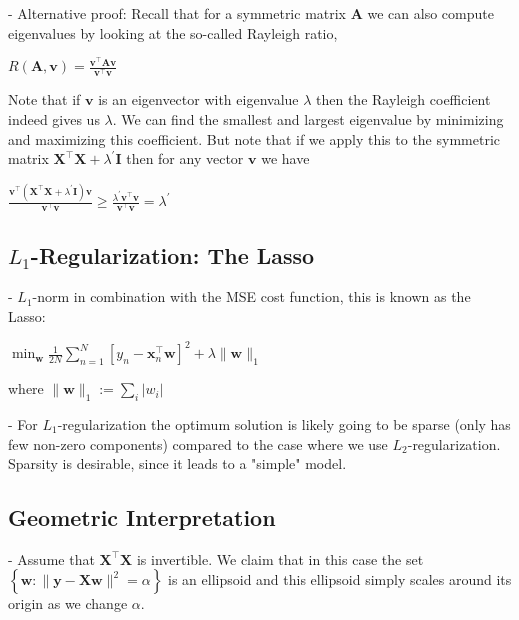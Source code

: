 - Alternative proof: Recall that for a symmetric matrix $\mathbf{A}$ we can also compute eigenvalues by looking at the so-called Rayleigh ratio,

$
R(\mathbf{A}, \mathbf{v})=\frac{\mathbf{v}^{\top} \mathbf{A} \mathbf{v}}{\mathbf{v}^{\top} \mathbf{v}}
$

Note that if $\mathbf{v}$ is an eigenvector with eigenvalue $\lambda$ then the Rayleigh coefficient indeed gives us $\lambda$. We can find the smallest and largest eigenvalue by minimizing and maximizing this coefficient. But note that if we apply this to the symmetric matrix $\mathbf{X}^{\top} \mathbf{X}+\lambda^{\prime} \mathbf{I}$ then for any vector $\mathbf{v}$ we have

$
\frac{\mathbf{v}^{\top}\left(\mathbf{X}^{\top} \mathbf{X}+\lambda^{\prime} \mathbf{I}\right) \mathbf{v}}{\mathbf{v}^{\top} \mathbf{v}} \geq \frac{\lambda^{\prime} \mathbf{v}^{\top} \mathbf{v}}{\mathbf{v}^{\top} \mathbf{v}}=\lambda^{\prime}
$

\subsection*{$L_{1}$-Regularization: The Lasso}
- $L_{1}$-norm in combination with the MSE cost function, this is known as the Lasso:

$\min _{\mathbf{w}} \frac{1}{2 N} \sum_{n=1}^{N}\left[y_{n}-\mathbf{x}_{n}^{\top} \mathbf{w}\right]^{2}+\lambda\|\mathbf{w}\|_{1}$

where $
\|\mathbf{w}\|_{1}:=\sum_{i}\left|w_{i}\right|
$

- For $L_{1}$-regularization the optimum solution is likely going to be sparse (only has few non-zero components) compared to the case where we use $L_{2}$-regularization. Sparsity is desirable, since it leads to a "simple" model.

\subsection*{Geometric Interpretation}

- Assume that $\mathbf{X}^{\top} \mathbf{X}$ is invertible. We claim that in this case the set $
\left\{\mathbf{w}:\|\mathbf{y}-\mathbf{X} \mathbf{w}\|^{2}=\alpha\right\}
$ is an ellipsoid and this ellipsoid simply scales around its origin as we change $\alpha$. 

